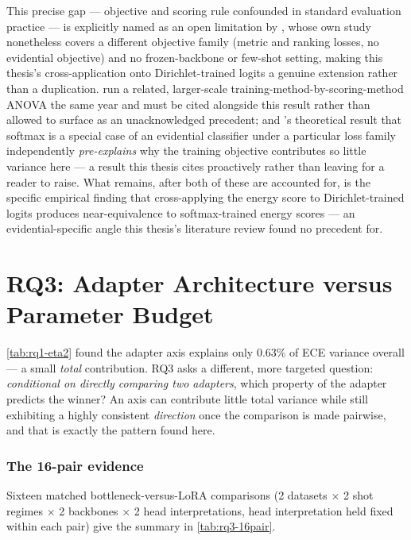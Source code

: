 \documentclass{iutbscthesis}
\begin{document}
This precise gap — objective and scoring rule confounded in standard evaluation practice — is explicitly named as an open limitation by \textcite{genc2026objectives}, whose own study nonetheless covers a different objective family (metric and ranking losses, no evidential objective) and no frozen-backbone or few-shot setting, making this thesis's cross-application onto Dirichlet-trained logits a genuine extension rather than a duplication. \textcite{krumpl2026onemodel} run a related, larger-scale training-method-by-scoring-method ANOVA the same year and must be cited alongside this result rather than allowed to surface as an unacknowledged precedent; and \textcite{hayta2026pluginlosses}'s theoretical result that softmax is a special case of an evidential classifier under a particular loss family independently \emph{pre-explains} why the training objective contributes so little variance here — a result this thesis cites proactively rather than leaving for a reader to raise. What remains, after both of these are accounted for, is the specific empirical finding that cross-applying the energy score to Dirichlet-trained logits produces near-equivalence to softmax-trained energy scores — an evidential-specific angle this thesis's literature review found no precedent for.

\section{RQ3: Adapter Architecture versus Parameter Budget}
\label{sec:results-rq3}

\autoref{tab:rq1-eta2} found the adapter axis explains only 0.63\% of ECE variance overall — a small \emph{total} contribution. RQ3 asks a different, more targeted question: \emph{conditional on directly comparing two adapters}, which property of the adapter predicts the winner? An axis can contribute little total variance while still exhibiting a highly consistent \emph{direction} once the comparison is made pairwise, and that is exactly the pattern found here.

\subsubsection{The 16-pair evidence}

Sixteen matched bottleneck-versus-LoRA comparisons (2 datasets $\times$ 2 shot regimes $\times$ 2 backbones $\times$ 2 head interpretations, head interpretation held fixed within each pair) give the summary in \autoref{tab:rq3-16pair}.
\end{document}
